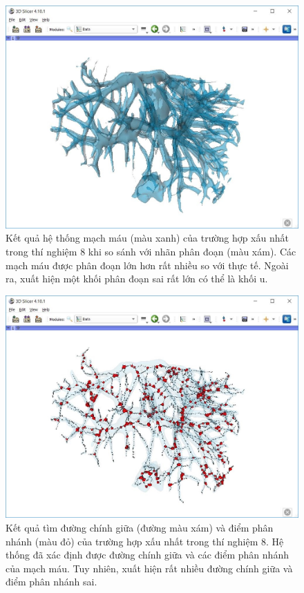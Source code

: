 	\begin{figure}[h!]
		\includegraphics[width=\textwidth]{figures/result_e8_worst_comparison}
		\caption[Kết quả hệ thống mạch máu của trường hợp xấu nhất trong thí nghiệm 8 và nhãn phân đoạn.]{Kết quả hệ thống mạch máu (màu xanh) của trường hợp xấu nhất trong thí nghiệm 8 khi so sánh với nhãn phân đoạn (màu xám). Các mạch máu được phân đoạn lớn hơn rất nhiều so với thực tế. Ngoài ra, xuất hiện một khối phân đoạn sai rất lớn có thể là khối u.}
		\label{fig:result_e8_worst_comparison}
	\end{figure}
	\begin{figure}[h!]
		\includegraphics[width=\textwidth]{figures/result_e8_worst_skeleton_branching_point}
		\caption[Kết quả tìm đường chính giữa và điểm phân nhánh của trường hợp xấu nhất trong thí nghiệm 8.]{Kết quả tìm đường chính giữa (đường màu xám) và điểm phân nhánh (màu đỏ) của trường hợp xấu nhất trong thí nghiệm 8. Hệ thống đã xác định được đường chính giữa và các điểm phân nhánh của mạch máu. Tuy nhiên, xuất hiện rất nhiều đường chính giữa và điểm phân nhánh sai.}
		\label{fig:result_e8_worst_skeleton_branching_point}
	\end{figure}